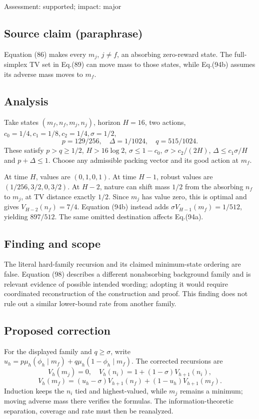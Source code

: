 \documentclass[11pt]{article}
\begin{document}
Assessment: supported; impact: major

\subsection*{Source claim (paraphrase)}

Equation (86) makes every \(m_j\), \(j\ne f\), an absorbing zero-reward state. The full-simplex TV set in Eq.(89) can move mass to those states, while Eq.(94b) assumes its adverse mass moves to \(m_f\).

\subsection*{Analysis}

Take states \((m_f,n_f,m_j,n_j)\), horizon \(H=16\), two actions, \(c_0=1/4,c_1=1/8,c_2=1/4,\sigma=1/2\), \[p=129/256,\quad \Delta=1/1024,\quad q=515/1024.\] These satisfy \(p>q\ge1/2\), \(H>16\log2\), \(\sigma\le1-c_0\), \(\sigma>c_2/(2H)\), \(\Delta\le c_1\sigma/H\) and \(p+\Delta\le1\). Choose any admissible packing vector and its good action at \(m_f\).

At time \(H\), values are \((0,1,0,1)\). At time \(H-1\), robust values are \((1/256,3/2,0,3/2)\). At \(H-2\), nature can shift mass \(1/2\) from the absorbing \(n_f\) to \(m_j\), at TV distance exactly \(1/2\). Since \(m_j\) has value zero, this is optimal and gives \(V_{H-2}(n_f)=7/4\). Equation (94b) instead adds \(\sigma V_{H-1}(m_f)=1/512\), yielding \(897/512\). The same omitted destination affects Eq.(94a).

\subsection*{Finding and scope}

The literal hard-family recursion and its claimed minimum-state ordering are false. Equation (98) describes a different nonabsorbing background family and is relevant evidence of possible intended wording; adopting it would require coordinated reconstruction of the construction and proof. This finding does not rule out a similar lower-bound rate from another family.

\subsection*{Proposed correction}

For the displayed family and \(q\ge\sigma\), write \(u_h=p\mu_h(\phi_h\mid m_f)+q\mu_h(1-\phi_h\mid m_f)\). The corrected recursions are \[V_h(m_j)=0,\quad V_h(n_i)=1+(1-\sigma)V_{h+1}(n_i),\] \[V_h(m_f)=(u_h-\sigma)V_{h+1}(n_f)+(1-u_h)V_{h+1}(m_f).\] Induction keeps the \(n_i\) tied and highest-valued, while \(m_j\) remains a minimum; moving adverse mass there verifies the formulas. The information-theoretic separation, coverage and rate must then be reanalyzed.
\end{document}
